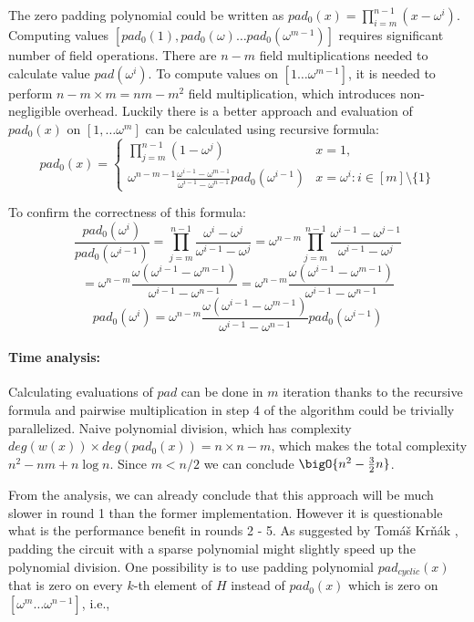 The zero padding polynomial could be written as $pad_0(x) = \prod_{i=m}^{n-1} (x - \omega^i)$. Computing values $[pad_0(1), pad_0(\omega) \ldots pad_0(\omega^{m-1})]$ requires significant number of field operations. There are $n-m$ field multiplications needed to calculate value $pad(\omega^i)$. To compute values on $[1 \ldots \omega^{m-1}]$, it is needed to perform $n-m \times m = nm - m^2$ field multiplication, which introduces non-negligible overhead. Luckily there is a better approach and evaluation of $pad_0(x)$ on $[1, \ldots \omega^m]$ can be calculated using recursive formula:
\begin{equation}
    \label{eq:recursive-formula}
    pad_0(x) =
    \begin{cases}
        \prod_{j=m}^{n-1} (1 - \omega^j) & x = 1,  \\
        \omega^{n-m-1} \frac{\omega^{i-1} - \omega^{m-1}}{\omega^{i-1} - \omega^{n-1}} pad_0(\omega^{i-1}) & x = \omega^i: i \in [m] \setminus \{1\}
    \end{cases}
\end{equation}

To confirm the correctness of this formula:
$$\frac{pad_0(\omega^i)}{pad_0(\omega^{i-1})} = \prod_{j = m}^{n-1} \frac{\omega^i - \omega^j}{\omega^{i-1} - \omega^j} = \omega^{n-m} \prod_{j = m}^{n-1} \frac{\omega^{i-1} - \omega^{j-1}}{\omega^{i-1} - \omega^j}$$
$$= \omega^{n-m} \frac{\omega(\omega^{i-1} - \omega^{m-1})}{\omega^{i-1} - \omega^{n-1}} = \omega^{n-m} \frac{\omega(\omega^{i-1} - \omega^{m-1})}{\omega^{i-1} - \omega^{n-1}}$$
$$pad_0(\omega^i) = \omega^{n-m} \frac{\omega(\omega^{i-1} - \omega^{m-1})}{\omega^{i-1} - \omega^{n-1}}pad_0(\omega^{i-1})$$


\paragraph{Time analysis:} Calculating evaluations of $pad$ can be done in $m$ iteration thanks to the recursive formula  and pairwise multiplication in step 4 of the algorithm could be trivially parallelized. Naive polynomial division, which has  complexity $deg(w(x))\times deg(pad_0(x)) = n \times n-m$, which makes the total complexity $n^2 - nm + n\log{n}$. Since $m < n/2$  we can conclude $\bigO{n^2 - \frac{3}{2}n}$.

From the analysis, we can already conclude that this approach will be much slower in round 1 than the former implementation. However it is questionable what is the performance benefit in rounds 2 - 5. As suggested by Tomáš Krňák \cite{tomas}, padding the circuit with a sparse polynomial might slightly speed up the polynomial division. One possibility is to use padding polynomial $pad_{cyclic}(x)$ that is zero on every $k$-th element of $H$ instead of  $pad_0(x)$ which is zero on $[\omega^m \ldots \omega^{n-1}]$, i.e.,

